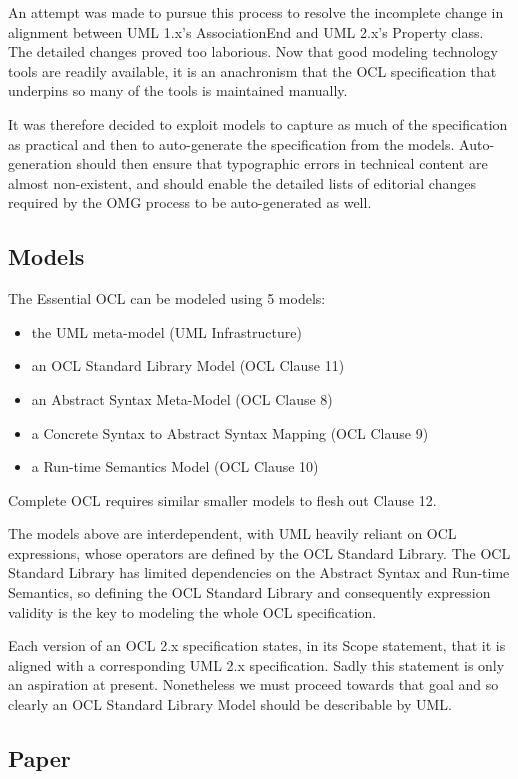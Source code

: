 \documentclass{eceasst}
\begin{document}
An attempt was made to pursue this process to resolve the incomplete change in alignment between UML 1.x's AssociationEnd and UML 2.x's Property class. The detailed changes proved too laborious. Now that good modeling technology tools are readily available, it is an anachronism that the OCL specification that underpins so many of the tools is maintained manually.

It was therefore decided to exploit models to capture as much of the specification as practical and then to auto-generate the specification from the models. Auto-generation should then ensure that typographic errors in technical content are almost non-existent, and should enable the detailed lists of editorial changes required by the OMG process to be auto-generated as well.

\subsection{Models}

The Essential OCL can be modeled using 5 models:
\begin{itemize}
\item the UML meta-model (UML Infrastructure)
\item an OCL Standard Library Model (OCL Clause 11)
\item an Abstract Syntax Meta-Model (OCL Clause 8)
\item a Concrete Syntax to Abstract Syntax Mapping (OCL Clause 9)
\item a Run-time Semantics Model (OCL Clause 10)
\end{itemize}

Complete OCL requires similar smaller models to flesh out Clause 12.

The models above are interdependent, with UML heavily reliant on OCL expressions, whose operators are defined by the OCL Standard Library. The OCL Standard Library has limited dependencies on the Abstract Syntax and Run-time Semantics, so defining the OCL Standard Library and consequently expression validity is the key to modeling the whole OCL specification.

Each version of an OCL 2.x specification states, in its Scope statement, that it is aligned with a corresponding UML 2.x specification. Sadly this statement is only an aspiration at present. Nonetheless we must proceed towards that goal and so clearly an OCL Standard Library Model should be describable by UML.

\subsection{Paper}
\end{document}
